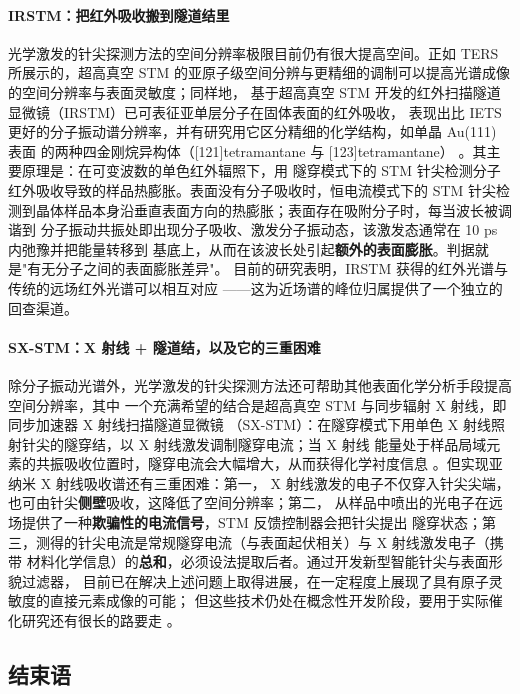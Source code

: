 \paragraph{IRSTM：把红外吸收搬到隧道结里}
光学激发的针尖探测方法的空间分辨率极限目前仍有很大提高空间。正如 TERS 所展示的，超高真空
STM 的亚原子级空间分辨与更精细的调制可以提高光谱成像的空间分辨率与表面灵敏度；同样地，
基于超高真空 STM 开发的红外扫描隧道显微镜（IRSTM）已可表征亚单层分子在固体表面的红外吸收，
表现出比 IETS 更好的分子振动谱分辨率，并有研究用它区分精细的化学结构，如单晶 Au(111) 表面
的两种四金刚烷异构体（[121]tetramantane 与 [123]tetramantane）
。其主要原理是：在可变波数的单色红外辐照下，用
隧穿模式下的 STM 针尖检测分子红外吸收导致的样品热膨胀。表面没有分子吸收时，恒电流模式下的
STM 针尖检测到晶体样品本身沿垂直表面方向的热膨胀；表面存在吸附分子时，每当波长被调谐到
分子振动共振处即出现分子吸收、激发分子振动态，该激发态通常在 10 ps 内弛豫并把能量转移到
基底上，从而在该波长处引起\textbf{额外的表面膨胀}。判据就是"有无分子之间的表面膨胀差异"。
目前的研究表明，IRSTM 获得的红外光谱与传统的远场红外光谱可以相互对应
——这为近场谱的峰位归属提供了一个独立的
回查渠道。

\paragraph{SX-STM：X 射线 + 隧道结，以及它的三重困难}
除分子振动光谱外，光学激发的针尖探测方法还可帮助其他表面化学分析手段提高空间分辨率，其中
一个充满希望的结合是超高真空 STM 与同步辐射 X 射线，即同步加速器 X 射线扫描隧道显微镜
（SX-STM）：在隧穿模式下用单色 X 射线照射针尖的隧穿结，以 X 射线激发调制隧穿电流；当 X 射线
能量处于样品局域元素的共振吸收位置时，隧穿电流会大幅增大，从而获得化学衬度信息
。但实现亚纳米 X 射线吸收谱还有三重困难：第一，
X 射线激发的电子不仅穿入针尖尖端，也可由针尖\textbf{侧壁}吸收，这降低了空间分辨率；第二，
从样品中喷出的光电子在远场提供了一种\textbf{欺骗性的电流信号}，STM 反馈控制器会把针尖提出
隧穿状态；第三，测得的针尖电流是常规隧穿电流（与表面起伏相关）与 X 射线激发电子（携带
材料化学信息）的\textbf{总和}，必须设法提取后者。通过开发新型智能针尖与表面形貌过滤器，
目前已在解决上述问题上取得进展，在一定程度上展现了具有原子灵敏度的直接元素成像的可能；
但这些技术仍处在概念性开发阶段，要用于实际催化研究还有很长的路要走
。

\subsection{结束语}
\label{sec:nano-end}

